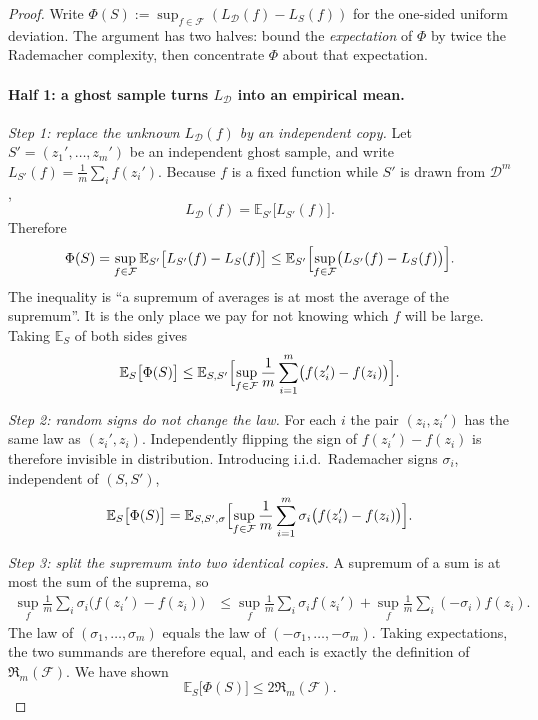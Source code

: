 \begin{proof}
Write $\Phi(S):=\sup_{f\in\mathcal{F}}(L_{\mathcal{D}}(f)-L_S(f))$ for the one-sided uniform deviation. The argument has two halves: bound the \emph{expectation} of $\Phi$ by twice the Rademacher complexity, then concentrate $\Phi$ about that expectation.

\paragraph{Half 1: a ghost sample turns $L_{\mathcal{D}}$ into an empirical mean.}

\textit{Step 1: replace the unknown $L_{\mathcal{D}}(f)$ by an independent copy.}
Let $S'=(z_1',\dots,z_m')$ be an independent ghost sample, and write $L_{S'}(f)=\frac1m\sum_i f(z_i')$. Because $f$ is a fixed function while $S'$ is drawn from $\mathcal{D}^m$,
\[
L_{\mathcal{D}}(f)
=
\mathbb{E}_{S'}\bigl[L_{S'}(f)\bigr].
\]
Therefore
\[
\Phi(S)
=
\sup_{f\in\mathcal{F}}\mathbb{E}_{S'}\bigl[L_{S'}(f)-L_S(f)\bigr]
\le
\mathbb{E}_{S'}\Bigl[\sup_{f\in\mathcal{F}}\bigl(L_{S'}(f)-L_S(f)\bigr)\Bigr].
\]
The inequality is ``a supremum of averages is at most the average of the supremum''. It is the only place we pay for not knowing which $f$ will be large. Taking $\mathbb{E}_S$ of both sides gives
\[
\mathbb{E}_S\bigl[\Phi(S)\bigr]
\le
\mathbb{E}_{S,S'}\Bigl[\sup_{f\in\mathcal{F}}\frac1m\sum_{i=1}^m\bigl(f(z_i')-f(z_i)\bigr)\Bigr].
\]

\textit{Step 2: random signs do not change the law.}
For each $i$ the pair $(z_i,z_i')$ has the same law as $(z_i',z_i)$. Independently flipping the sign of $f(z_i')-f(z_i)$ is therefore invisible in distribution. Introducing i.i.d.\ Rademacher signs $\sigma_i$, independent of $(S,S')$,
\[
\mathbb{E}_S\bigl[\Phi(S)\bigr]
=
\mathbb{E}_{S,S',\sigma}\Bigl[\sup_{f\in\mathcal{F}}\frac1m\sum_{i=1}^m\sigma_i\bigl(f(z_i')-f(z_i)\bigr)\Bigr].
\]

\textit{Step 3: split the supremum into two identical copies.}
A supremum of a sum is at most the sum of the suprema, so
\begin{align*}
\sup_{f}\frac1m\sum_i\sigma_i\bigl(f(z_i')-f(z_i)\bigr)
&\le
\sup_{f}\frac1m\sum_i\sigma_i f(z_i')
+
\sup_{f}\frac1m\sum_i(-\sigma_i)f(z_i).
\end{align*}
The law of $(\sigma_1,\dots,\sigma_m)$ equals the law of $(-\sigma_1,\dots,-\sigma_m)$. Taking expectations, the two summands are therefore equal, and each is exactly the definition of $\mathfrak{R}_m(\mathcal{F})$. We have shown
\[
\mathbb{E}_S\bigl[\Phi(S)\bigr]
\le
2\mathfrak{R}_m(\mathcal{F}).
\]


\end{proof}
